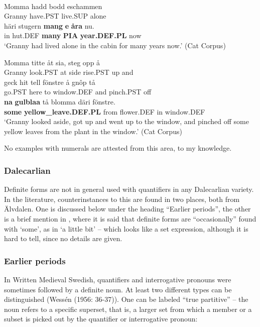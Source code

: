 \ea\label{}
\\
\gll Momma  hadd  bodd  eschammen\\
Granny  have.PST  live.SUP  alone\\
\gll häri  stugern  \textbf{mang} \textbf{  e} \textbf{  åra} nu.\\
in  hut.DEF  \textbf{many} \textbf{PIA} \textbf{year.DEF.PL} now\\
\glt ‘Granny had lived alone in the cabin for many years now.’ (Cat Corpus)

\z

\ea
\gll Momma  titte  åt  sia,   steg  opp  å\\
Granny  look.PST  at  side  rise.PST  up  and\\
\gll geck  hit  tell  fönstre  å  gnôp  tå\\
go.PST  here  to  window.DEF  and  pinch.PST  off\\
\gll \textbf{na} \textbf{  gulblaa} tå  blomma  däri  fönstre.\\
\textbf{some} \textbf{yellow\_leave.DEF.PL} from  flower.DEF  in  window.DEF\\
\glt ‘Granny looked aside, got up and went up to the window, and pinched off some yellow leaves from the plant in the window.’ (Cat Corpus)

\z

No examples with numerals are attested from this area, to my knowledge.

\subsubsection{Dalecarlian}
Definite forms are not in general used with quantifiers in any Dalecarlian variety. In the literature, counterinstances to this are found in two places, both from Älvdalen. One is discussed below under the heading “Earlier periods”, the other is a brief mention in \citet[95]{Levander1909}, where it is said that definite forms are “occasionally” found with ‘some’, as in ‘a little bit’ – which looks like a set expression, although it is hard to tell, since no details are given.

\subsubsection{Earlier periods}
 In Written Medieval Swedish, quantifiers and interrogative pronouns were sometimes followed by a definite noun. At least two different types can be distinguished (Wessén (1956: 36-37)). One can be labeled “true partitive” – the noun refers to a specific superset, that is, a larger set from which a member or a subset is picked out by the quantifier or interrogative pronoun:


